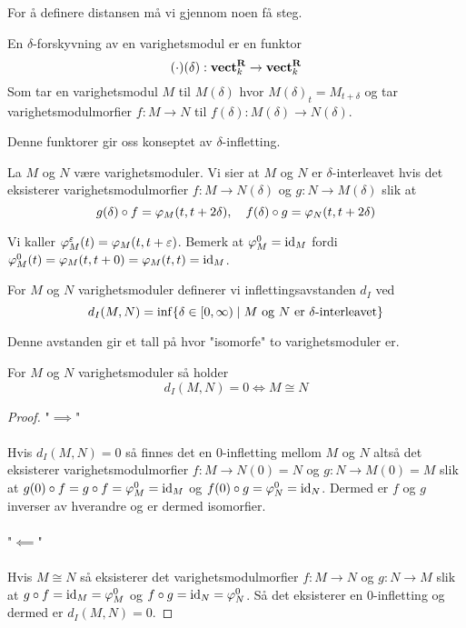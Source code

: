 For å definere distansen må vi gjennom noen få steg.
\begin{definisjon}\label{Def:DShift}
	En $\delta$-forskyvning av en varighetsmodul er en funktor
	\[(\cdot)(\delta): \textnormal{\textbf{vect}}_k^{\textnormal{\textbf{R}}}\to \textnormal{\textbf{vect}}_k^{\textnormal{\textbf{R}}}\]
	Som tar en varighetsmodul $M$ til $M(\delta)$ hvor $M(\delta)_t = M_{t+\delta}$ og tar varighetsmodulmorfier $f:M\to N$ til $f(\delta):M(\delta)\to N(\delta)$.
\end{definisjon}

Denne funktorer gir oss konseptet av $\delta$-infletting.

\begin{definisjon}\label{Def:infletting}
	La $M$ og $N$ være varighetsmoduler. Vi sier at $M$ og $N$ er $\delta$-interleavet hvis det eksisterer varighetsmodulmorfier $f:M\to N(\delta)$ og $g:N\to M(\delta)$ slik at
	\[g(\delta)\circ f = \varphi_M(t,t+2\delta),\quad f(\delta)\circ g = \varphi_N(t,t+2\delta)\]
\end{definisjon}
Vi kaller $\varphi^\varepsilon_M(t) = \varphi_M(t,t+\varepsilon)$. Bemerk at $\varphi^0_M=\textnormal{id}_M$ fordi $\varphi^0_M(t) = \varphi_M(t,t+0)=\varphi_M(t,t)=\textnormal{id}_M$.

\begin{definisjon}\label{Def:label}
	For $M$ og $N$ varighetsmoduler definerer vi inflettingsavstanden $d_I$ ved
	\[d_I(M,N) = \inf\{\delta\in [0,\infty)\mid \text{$M$ og $N$ er $\delta$-interleavet}\}\]
\end{definisjon}
Denne avstanden gir et tall på hvor "isomorfe" to varighetsmoduler er.

\begin{proposisjon}\label{Cor:label}
	For $M$ og $N$ varighetsmoduler så holder
	\[d_I(M,N) = 0 \iff M\cong N\]
\end{proposisjon}
\begin{proof}
	"$\implies$"\\\\
	Hvis $d_I(M,N) = 0$ så finnes det en $0$-infletting mellom $M$ og $N$ altså det eksisterer varighetsmodulmorfier $f: M \to N(0)=N$ og $g: N\to M(0)=M$ slik at $g(0)\circ f = g\circ f = \varphi_M^0=\textnormal{id}_M$ og $f(0)\circ g = \varphi_N^0=\textnormal{id}_N$. Dermed er $f$ og $g$ inverser av hverandre og er dermed isomorfier.\\\\
	"$\impliedby$"\\\\
	Hvis $M\cong N$ så eksisterer det varighetsmodulmorfier $f:M\to N$ og $g:N\to M$ slik at $g\circ f = \textnormal{id}_M=\varphi_M^0$ og $f\circ g=\textnormal{id}_N=\varphi_N^0$. Så det eksisterer en $0$-infletting og dermed er $d_I(M,N) = 0$.
\end{proof}


